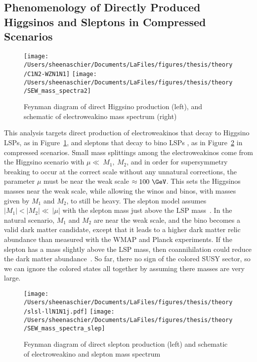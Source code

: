 \subsection{Phenomenology of Directly Produced Higgsinos and Sleptons in Compressed Scenarios}
\label{sec:pheno}
 \begin{figure}%
  \begin{center}
  \texttt{[image: /Users/sheenaschier/Documents/LaFiles/figures/thesis/theory/C1N2-WZN1N1]}
  \texttt{[image: /Users/sheenaschier/Documents/LaFiles/figures/thesis/theory/SEW\_mass\_spectra2]}
   \end{center}
 \caption{Feynman diagram of direct Higgsino production (left), and schematic of electroweakino mass spectrum (right)}
 \label{fig:fn1}
 \end{figure}
This analysis targets direct production of electroweakinos that decay to  Higgsino LSPs, as in Figure~\ref{fig:fn1}, and sleptons that decay to bino LSPs , as in Figure~\ref{fig:fn2} in compressed scenarios.  Small mass splittings among the electroweakinos come from the Higgsino scenario with $\mu\ll~M_1,~M_2$, and in order for supersymmetry breaking to occur at the correct scale without any unnatural corrections, the parameter $\mu$ must be near the weak scale $\approx 100~\GeV$.  This sets the Higgsinos masses near the weak scale, while allowing the winos and binos, with masses given by $M_1$ and $M_2$, to still be heavy.  The slepton model assumes $|M_1| <|M_2|\ll~|\mu|$ with the slepton mass just above the LSP mass~\cite{gondolo}.  In the natural scenario, $M_1$ and $M_2$ are near the weak scale, and the bino becomes a valid dark matter candidate, except that it leads to a higher dark matter relic abundance than measured with the WMAP and Planck experiments.  If the slepton has a mass slightly above the LSP mass, then coannihilation could reduce the dark matter abundance~\cite{seckel}.  So far, there no sign of the colored SUSY sector, so we can ignore the colored states all together by assuming there masses are very large.  
   \begin{figure}%
  \begin{center}
  \texttt{[image: /Users/sheenaschier/Documents/LaFiles/figures/thesis/theory/slsl-llN1N1j.pdf]}
   \texttt{[image: /Users/sheenaschier/Documents/LaFiles/figures/thesis/theory/SEW\_mass\_spectra\_slep]}
   \end{center}
 \caption{Feynman diagram of direct slepton production (left) and schematic of electroweakino and slepton mass spectrum}
 \label{fig:fn2}
  \end{figure}


